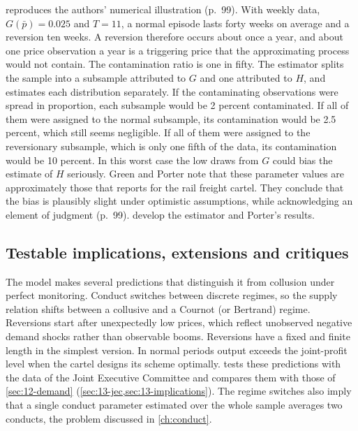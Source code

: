  reproduces the authors' numerical illustration (p.~99). With weekly data,
$G(\bar p) = 0.025$ and $T = 11$, a normal episode lasts forty weeks on average and a reversion ten weeks. A
reversion therefore occurs about once a year, and about one price observation a year is a triggering price that the
approximating process would not contain. The contamination ratio is one in fifty. The estimator splits the sample
into a subsample attributed to $G$ and one attributed to $H$, and estimates each distribution separately. If the
contaminating observations were spread in proportion, each subsample would be 2 percent contaminated. If all of them
were assigned to the normal subsample, its contamination would be 2.5 percent, which still seems negligible. If all
of them were assigned to the reversionary subsample, which is only one fifth of the data, its contamination would be
10 percent. In this worst case the low draws from $G$ could bias the estimate of $H$ seriously. Green and Porter
note that these parameter values are approximately those that \citet{Porter1983} reports for the rail freight
cartel. They conclude that the bias is plausibly slight under optimistic assumptions, while acknowledging an element
of judgment (p.~99).  develop the estimator and Porter's results.

\subsection{Testable implications, extensions and critiques}\label{sec:12-gp-assessment}

The model makes several predictions that distinguish it from collusion under perfect monitoring. Conduct switches
between discrete regimes, so the supply relation shifts between a collusive and a Cournot (or Bertrand) regime.
Reversions start after unexpectedly low prices, which reflect unobserved negative demand shocks rather than
observable booms. Reversions have a fixed and finite length in the simplest version. In normal periods output
exceeds the joint-profit level when the cartel designs its scheme optimally.  tests these
predictions with the data of the Joint Executive Committee and compares them with those of
\cref{sec:12-demand} (\cref{sec:13-jec,sec:13-implications}). The regime switches also imply that a single conduct
parameter estimated over the whole sample averages two conducts, the problem discussed in \cref{ch:conduct}.

